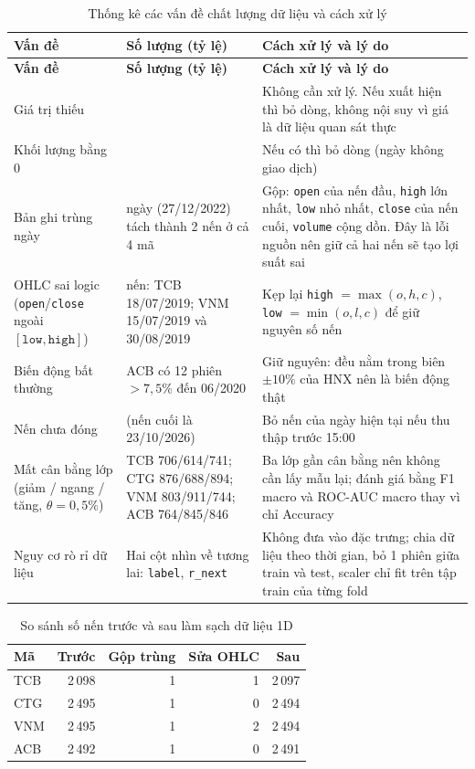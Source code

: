 \documentclass[12pt,a4paper,oneside]{report}
\begin{document}
\begin{longtable}{p{2.9cm} >{\centering\arraybackslash}p{3.4cm} p{8.6cm}}
  \caption{Thống kê các vấn đề chất lượng dữ liệu và cách xử lý}\label{tab:chatluong}\\
  \toprule
  \textbf{Vấn đề} & \textbf{Số lượng (tỷ lệ)} & \textbf{Cách xử lý và lý do} \\
  \midrule
  \endfirsthead
  \toprule
  \textbf{Vấn đề} & \textbf{Số lượng (tỷ lệ)} & \textbf{Cách xử lý và lý do} \\
  \midrule
  \endhead
  \bottomrule
  \endfoot
        Giá trị thiếu & 0 & Không cần xử lý. Nếu xuất hiện thì bỏ dòng, không nội suy vì giá là dữ liệu quan sát thực \\
    Khối lượng bằng 0 & 0 & Nếu có thì bỏ dòng (ngày không giao dịch) \\
    Bản ghi trùng ngày & 1 ngày (27/12/2022) tách thành 2 nến ở cả 4 mã & Gộp: \texttt{open} của nến đầu, \texttt{high} lớn nhất, \texttt{low} nhỏ nhất, \texttt{close} của nến cuối, \texttt{volume} cộng dồn. Đây là lỗi nguồn nên giữ cả hai nến sẽ tạo lợi suất sai \\
    OHLC sai logic (\texttt{open}/\texttt{close} ngoài $[\texttt{low},\texttt{high}]$) & 3 nến: TCB 18/07/2019; VNM 15/07/2019 và 30/08/2019 & Kẹp lại \texttt{high} $=\max(o,h,c)$, \texttt{low} $=\min(o,l,c)$ để giữ nguyên số nến \\
    Biến động bất thường & ACB có 12 phiên $>7{,}5\%$ đến 06/2020 & Giữ nguyên: đều nằm trong biên $\pm 10\%$ của HNX nên là biến động thật \\
    Nến chưa đóng & 0 (nến cuối là 23/10/2026) & Bỏ nến của ngày hiện tại nếu thu thập trước 15:00 \\
    Mất cân bằng lớp (giảm / ngang / tăng, $\theta = 0{,}5\%$) & TCB 706/614/741; CTG 876/688/894; VNM 803/911/744; ACB 764/845/846 & Ba lớp gần cân bằng nên không cần lấy mẫu lại; đánh giá bằng F1 macro và ROC-AUC macro thay vì chỉ Accuracy \\
    Nguy cơ rò rỉ dữ liệu & Hai cột nhìn về tương lai: \texttt{label}, \texttt{r\_next} & Không đưa vào đặc trưng; chia dữ liệu theo thời gian, bỏ 1 phiên giữa train và test, scaler chỉ fit trên tập train của từng fold \\
\end{longtable}

\begin{table}[H]
  \centering
  \caption{So sánh số nến trước và sau làm sạch dữ liệu 1D}
  \label{tab:truocsau}
  \begin{tabular}{lrrrr}
    \toprule
    \textbf{Mã} & \textbf{Trước} & \textbf{Gộp trùng} & \textbf{Sửa OHLC} & \textbf{Sau} \\
    \midrule
    TCB & 2\,098 & 1 & 1 & 2\,097 \\
    CTG & 2\,495 & 1 & 0 & 2\,494 \\
    VNM & 2\,495 & 1 & 2 & 2\,494 \\
    ACB & 2\,492 & 1 & 0 & 2\,491 \\
    \bottomrule
  \end{tabular}
\end{table}
\end{document}
